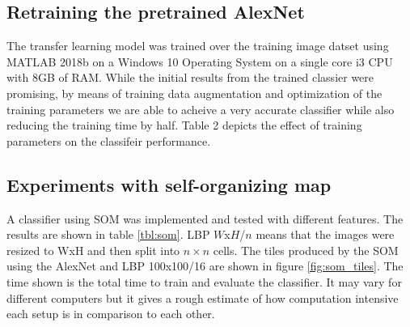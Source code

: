 \documentclass[doc/report.tex]{subfiles}
\begin{document}
\subsection{Retraining the pretrained AlexNet}
The transfer learning model was trained over the training image datset using
MATLAB 2018b on a Windows 10 Operating System on a single core i3 CPU with 8GB
of RAM. While the initial results from the trained classier were promising, by
means of training data augmentation and optimization of the training parameters
we are able to acheive a very accurate classifier while also reducing the
training time by half. Table 2 depicts the effect of training parameters on the
classifeir performance. 

\begin{table}[h]
\centering
\caption{Training Parameter Analysis}
\label{tab:my-table2}
\end{table}

\subsection{Experiments with self-organizing map}
A classifier using SOM was implemented and tested with different features.  The
results are shown in table \ref{tbl:som}. LBP $W$x$H$/$n$ means that the images
were resized to WxH and then split into $n\times n$ cells. The tiles produced
by the SOM using the AlexNet and LBP 100x100/16 are shown in figure
\ref{fig:som_tiles}. The time shown is the total time to train and evaluate the
classifier. It may vary for different computers but it gives a rough estimate
of how computation intensive each setup is in comparison to each other.
    
\end{document}
